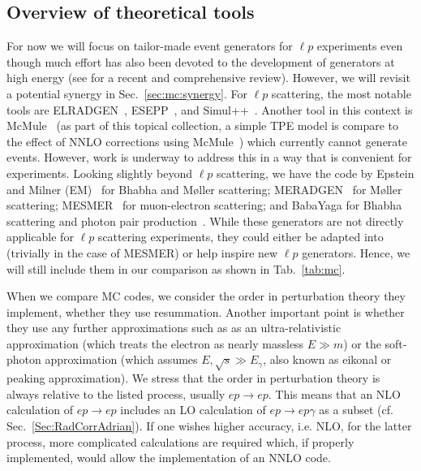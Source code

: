 \subsection{Overview of theoretical tools}

For now we will focus on tailor-made event generators for $\ell$$p$ experiments even though much effort has also been devoted to the development of generators at high energy (see \cite{Campbell:2022qmc} for a recent and comprehensive review).
However, we will revisit a potential synergy in Sec.~\ref{sec:mc:synergy}.
For $\ell$$p$ scattering, the most notable tools are {\sc ELRADGEN}~\cite{Afanasev:2003ic,Akushevich:2011zy}, {\sc ESEPP}~\cite{Gramolin:2014pva}, and {\sc Simul++}~\cite{Vanderhaeghen:2000ws,A1:2013fsc,Mihovilovic:2016rkr}.
Another tool in this context is {\sc McMule}~\cite{Banerjee:2020rww,Ulrich:2020frs} (as part of this topical collection, a simple TPE model is compare to the effect of NNLO corrections using McMule~\cite{McMule})  which currently cannot generate events.
However, work is underway to address this in a way that is convenient for experiments.
Looking slightly beyond $\ell p$ scattering, we have
the code by Epstein and Milner (EM)~\cite{Epstein:2016lpm} for Bhabha and M\o{}ller scattering;
{\sc MERADGEN}~\cite{Afanasev:2006xs} for M\o{}ller scattering;
{\sc MESMER}~\cite{CarloniCalame:2019mbo,CarloniCalame:2020yoz,Budassi:2021twh,Budassi:2022kqs} for muon-electron scattering;
and {\sc BabaYaga} for Bhabha scattering and photon pair production~\cite{CarloniCalame:2000pz,CarloniCalame:2001ny,CarloniCalame:2003yt,Balossini:2006wc,Balossini:2008xr}.
While these generators are not directly applicable for $\ell p$ scattering experiments, they could either be adapted into (trivially in the case of {\sc MESMER}) or help inspire new $\ell p$ generators.
Hence, we will still include them in our comparison as shown in Tab.~\ref{tab:mc}.

When we compare MC codes, we consider the order in perturbation theory they implement, whether they use resummation.
Another important point is whether they use any further approximations such as as an ultra-relativistic approximation (which treats the electron as nearly massless $E\gg m$) or the soft-photon approximation (which assumes $E,\sqrt{s} \gg E_\gamma$, also known as eikonal or peaking approximation).
We stress that the order in perturbation theory is always relative to the listed process, usually $ep\to ep$.
This means that an NLO calculation of $ep\to ep$ includes an LO calculation of $ep\to ep\gamma$ as a subset (cf. Sec.~\ref{Sec:RadCorrAdrian}).
If one wishes higher accuracy, i.e. NLO, for the latter process, more complicated calculations are required which, if properly implemented, would allow the implementation of an NNLO code.

